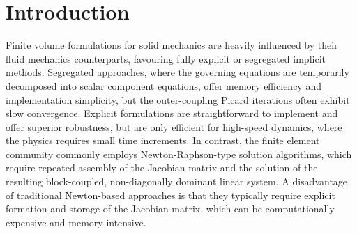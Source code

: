 \documentclass[sn-mathphys,Numbered]{sn-jnl}%
\begin{document}

\maketitle


\section{Introduction}\label{sec:intro}
%
Finite volume formulations for solid mechanics are heavily influenced by their fluid mechanics counterparts, favouring fully explicit \citep{Trangenstein1991, Kluth2010, Lee2013, Haider2017} or segregated implicit \citep{Demirdzic1988, Fryer1991, Demirdzic1995, Jasak2000, Tukovic2013, Cardiff2017, Tukovic2018, Batistic2022} methods.
Segregated approaches, where the governing equations are temporarily decomposed into scalar component equations, offer memory efficiency and implementation simplicity, but the outer-coupling Picard iterations often exhibit slow convergence.
Explicit formulations are straightforward to implement and offer superior robustness, but are only efficient for high-speed dynamics, where the physics requires small time increments.
In contrast, the finite element community commonly employs Newton-Raphson-type solution algorithms, which require repeated assembly of the Jacobian matrix and the solution of the resulting block-coupled, non-diagonally dominant linear system.
A disadvantage of traditional Newton-based approaches is that they typically require explicit formation and storage of the Jacobian matrix, which can be computationally expensive and memory-intensive.
\end{document}
